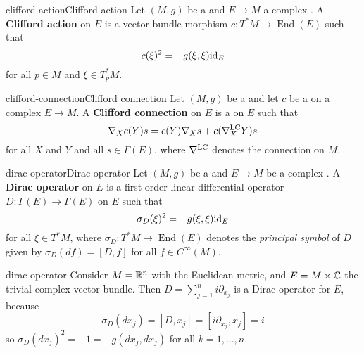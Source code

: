 \begin{topic}{clifford-action}{Clifford action}
    Let $(M, g)$ be a  and $E \to M$ a complex . A \textbf{Clifford action} on $E$ is a vector bundle morphism $c : T^*M \to \operatorname{End}(E)$ such that
    \[ c(\xi)^2 = - g(\xi, \xi) \textup{id}_E \]
    for all $p \in M$ and $\xi \in T^*_p M$.
\end{topic}

\begin{topic}{clifford-connection}{Clifford connection}
    Let $(M, g)$ be a  and let $c$ be a  on a complex  $E \to M$. A \textbf{Clifford connection} on $E$ is a  on $E$ such that
    \[ \nabla_X c(Y) s = c(Y) \nabla_X s + c(\nabla^{\textup{LC}}_X Y) s \]
    for all  $X$ and $Y$ and all $s \in \Gamma(E)$, where $\nabla^{\textup{LC}}$ denotes the  connection on $M$.
\end{topic}

\begin{topic}{dirac-operator}{Dirac operator}
    Let $(M, g)$ be a  and $E \to M$ be a complex . A \textbf{Dirac operator} on $E$ is a first order linear differential operator $D : \Gamma(E) \to \Gamma(E)$ on $E$ such that
    \[ \sigma_D(\xi)^2 = - g(\xi, \xi) \textup{id}_E \]
    for all $\xi \in T^*M$, where $\sigma_D : T^*M \to \operatorname{End}(E)$ denotes the \textit{principal symbol} of $D$ given by $\sigma_D(df) = [D, f]$ for all $f \in C^\infty(M)$.
\end{topic}

\begin{example}{dirac-operator}
    Consider $M = \mathbb{R}^n$ with the Euclidean metric, and $E = M \times \mathbb{C}$ the trivial complex vector bundle. Then $D = \sum_{j = 1}^{n} i \partial_{x_j}$ is a Dirac operator for $E$, because
    \[ \sigma_D(dx_j) = [D, x_j] = [i \partial_{x_j}, x_j] = i \]
    so $\sigma_D(dx_j)^2 = -1 = - g(dx_j, dx_j)$ for all $k = 1, \ldots, n$.
\end{example}

